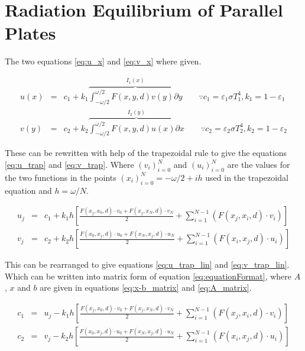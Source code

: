 \section{Radiation Equilibrium of Parallel Plates}
The two equations \ref{eq:u_x} and \ref{eq:v_x} where given.


\begin{eqnarray}
u(x) &=& c_1 + k_1 \overbrace{\int^{\omega/2}_{-\omega/2} F(x,y,d)v(y) \partial y}^{I_1(x)} \qquad \because c_1 = \varepsilon_1  \sigma T_1^4, k_1 = 1 - \varepsilon_1 \label{eq:u_x} \\
v(y) &=& c_2 + k_2 \overbrace{\int^{\omega/2}_{-\omega/2} F(x,y,d)u(x) \partial x}^{I_2(y)} \qquad \because c_2 = \varepsilon_2  \sigma T_2^4, k_2 = 1 - \varepsilon_2 \label{eq:v_x}
\end{eqnarray}

These can be rewritten with help of the trapezoidal rule to give the equations \ref{eq:u_trap} and \ref{eq:v_trap}.
Where $(v_i)_{i=0}^N$ and $(u_i)_{i=0}^N$ are the values for the two functions in the points $(x_i)_{i=0}^N = -\omega/2 + i h$ used in the trapezoidal equation and $h = \omega/N$.

\begin{eqnarray}
u_j &=& c_1 + k_1 h \left[ \frac{F(x_j, x_0, d) \cdot v_0 + F(x_j, x_N, d) \cdot v_N}{2} + \sum_{i = 1}^{N-1} \left( F(x_j, x_i, d) \cdot v_i \right) \right] \label{eq:u_trap}\\
v_j &=& c_2 + k_2 h \left[ \frac{F(x_0, x_j, d) \cdot u_0 + F(x_N, x_j, d) \cdot u_N}{2} + \sum_{i = 1}^{N-1} \left( F(x_i, x_j, d) \cdot u_i \right) \right] \label{eq:v_trap}
\end{eqnarray}

This can be rearranged to give equations \ref{eq:u_trap_lin} and \ref{eq:v_trap_lin}.
Which can be written into matrix form of equation \ref{eq:equationFormat}, where $A$, $x$ and $b$ are given in equations \ref{eq:x-b_matrix} and \ref{eq:A_matrix}.

\begin{eqnarray}
c_1 &=& u_j - k_1 h \left[ \frac{F(x_j, x_0, d) \cdot v_0 + F(x_j, x_N, d) \cdot v_N}{2} + \sum_{i = 1}^{N-1} \left( F(x_j, x_i, d) \cdot v_i \right) \right] \label{eq:u_trap_lin}\\
c_2 &=& v_j - k_2 h \left[ \frac{F(x_0, x_j, d) \cdot u_0 + F(x_N, x_j, d) \cdot u_N}{2} + \sum_{i = 1}^{N-1} \left( F(x_i, x_j, d) \cdot u_i \right) \right] \label{eq:v_trap_lin}
\end{eqnarray}


